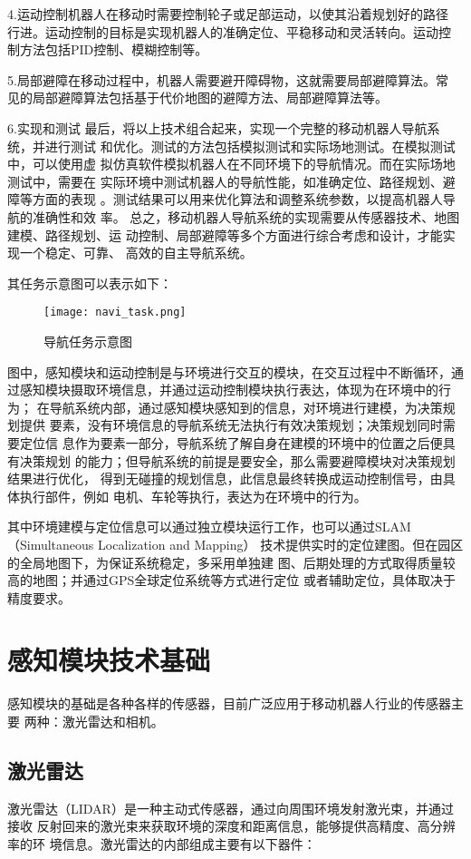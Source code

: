 4.运动控制机器人在移动时需要控制轮子或足部运动，以使其沿着规划好的路径
行进。运动控制的目标是实现机器人的准确定位、平稳移动和灵活转向。运动控
制方法包括PID控制、模糊控制等。

5.局部避障在移动过程中，机器人需要避开障碍物，这就需要局部避障算法。常
见的局部避障算法包括基于代价地图的避障方法、局部避障算法等。

6.实现和测试
最后，将以上技术组合起来，实现一个完整的移动机器人导航系统，并进行测试
和优化。测试的方法包括模拟测试和实际场地测试。在模拟测试中，可以使用虚
拟仿真软件模拟机器人在不同环境下的导航情况。而在实际场地测试中，需要在
实际环境中测试机器人的导航性能，如准确定位、路径规划、避障等方面的表现
。测试结果可以用来优化算法和调整系统参数，以提高机器人导航的准确性和效
率。
总之，移动机器人导航系统的实现需要从传感器技术、地图建模、路径规划、运
动控制、局部避障等多个方面进行综合考虑和设计，才能实现一个稳定、可靠、
高效的自主导航系统。


其任务示意图可以表示如下：

\begin{figure}[ht]
    \centering
    \texttt{[image: navi\_task.png]}
    \caption{导航任务示意图}
\end{figure}
图中，感知模块和运动控制是与环境进行交互的模块，在交互过程中不断循环，通
过感知模块摄取环境信息，并通过运动控制模块执行表达，体现为在环境中的行为；
在导航系统内部，通过感知模块感知到的信息，对环境进行建模，为决策规划提供
要素，没有环境信息的导航系统无法执行有效决策规划；决策规划同时需要定位信
息作为要素一部分，导航系统了解自身在建模的环境中的位置之后便具有决策规划
的能力；但导航系统的前提是要安全，那么需要避障模块对决策规划结果进行优化，
得到无碰撞的规划信息，此信息最终转换成运动控制信号，由具体执行部件，例如
电机、车轮等执行，表达为在环境中的行为。

其中环境建模与定位信息可以通过独立模块运行工作，也可以通过SLAM（Simultaneous Localization and Mapping）
技术提供实时的定位建图。但在园区的全局地图下，为保证系统稳定，多采用单独建
图、后期处理的方式取得质量较高的地图；并通过GPS全球定位系统等方式进行定位
或者辅助定位，具体取决于精度要求。


\section{感知模块技术基础}
感知模块的基础是各种各样的传感器，目前广泛应用于移动机器人行业的传感器主要
两种：激光雷达和相机。

\subsection{激光雷达}
激光雷达（LIDAR）是一种主动式传感器，通过向周围环境发射激光束，并通过接收
反射回来的激光束来获取环境的深度和距离信息，能够提供高精度、高分辨率的环
境信息。激光雷达的内部组成主要有以下器件：

